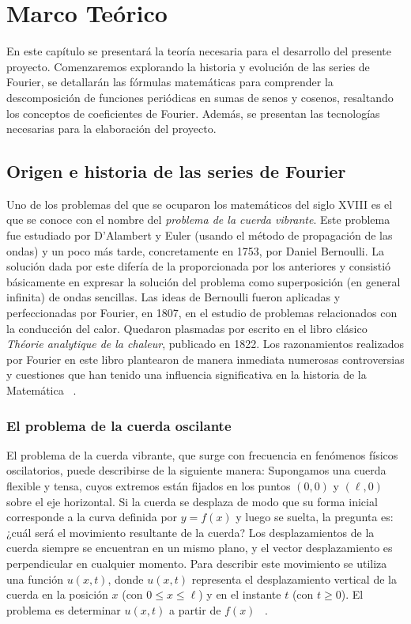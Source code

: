 \chapter{Marco Teórico}\label{ch:Marco Teórico}
En este capítulo se presentará la teoría necesaria para el desarrollo del presente proyecto. Comenzaremos explorando la historia y evolución de las series de Fourier, se detallarán las fórmulas matemáticas para comprender la descomposición de funciones periódicas en sumas de senos y cosenos, resaltando los conceptos de coeficientes de Fourier. Además, se presentan las tecnologías necesarias para la elaboración del proyecto.

\section{Origen e historia de las series de Fourier}
Uno de los problemas del que se ocuparon los matemáticos del siglo XVIII es el que se conoce con el nombre del \textit{problema de la cuerda vibrante}. Este problema fue estudiado por D’Alambert y Euler (usando el método de propagación de las ondas) y un poco más tarde, concretamente en 1753, por Daniel Bernoulli. La solución dada por este difería de la proporcionada por los anteriores y consistió básicamente en expresar la solución del problema como superposición (en general infinita) de ondas sencillas. 
\newline
Las ideas de Bernoulli fueron aplicadas y perfeccionadas por Fourier, en 1807, en el estudio de problemas relacionados con la conducción del calor. Quedaron plasmadas por escrito en el libro clásico \emph{Théorie analytique de la chaleur}, publicado en 1822. Los razonamientos realizados por Fourier en este libro plantearon de manera inmediata numerosas controversias y cuestiones que han tenido una influencia significativa en la historia de la Matemática ~\cite{historia-alambert-fourier-euler}.

\subsection{El problema de la cuerda oscilante}

El problema de la cuerda vibrante, que surge con frecuencia en fenómenos físicos oscilatorios, puede describirse de la siguiente manera: Supongamos una cuerda flexible y tensa, cuyos extremos están fijados en los puntos $(0,0)$ y $(\ell, 0)$ sobre el eje horizontal. Si la cuerda se desplaza de modo que su forma inicial corresponde a la curva definida por $y = f(x)$ y luego se suelta, la pregunta es: ¿cuál será el movimiento resultante de la cuerda?
\newline
Los desplazamientos de la cuerda siempre se encuentran en un mismo plano, y el vector desplazamiento es perpendicular en cualquier momento. Para describir este movimiento se utiliza una función $u(x, t)$, donde $u(x, t)$ representa el desplazamiento vertical de la cuerda en la posición $x$ (con $0 \leq x \leq \ell$) y en el instante $t$ (con $t \geq 0$). El problema es determinar $u(x, t)$ a partir de $f(x)$ ~\cite{weinbergerEDP}.

